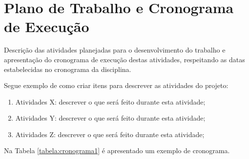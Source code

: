 \documentclass[
    12pt,               %
    a4paper,            %
    english,            %
    brazil,             %
    ]{article}
\begin{document}
\section{Plano de Trabalho e Cronograma de Execução}

    Descrição das atividades planejadas para o desenvolvimento do trabalho e apresentação do cronograma de
execução destas atividades, respeitando as datas estabelecidas no cronograma da disciplina.


    Segue exemplo de como criar itens para descrever as atividades do projeto:

    \begin{enumerate}

        \item Atividades X: descrever o que será feito durante esta atividade;   \label{a1}

        \item Atividades Y: descrever o que será feito durante esta atividade;   \label{a2}

        \item Atividades Z: descrever o que será feito durante esta atividade;   \label{a3}

    \end{enumerate}

    Na Tabela \ref{tabela:cronograma1} é apresentado um exemplo de cronograma.

\end{document}
